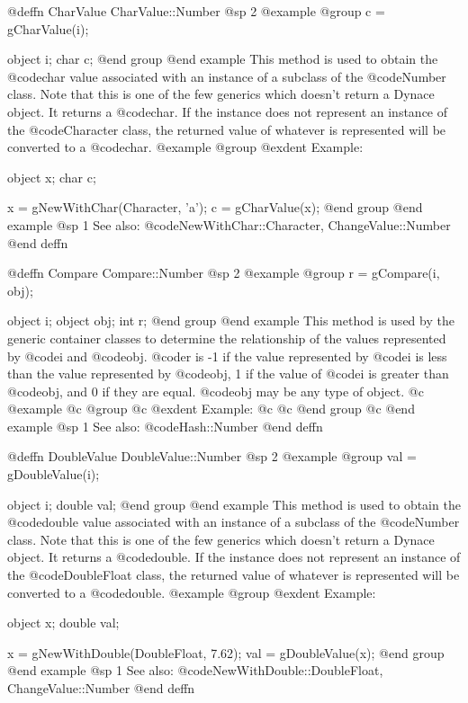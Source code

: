 @deffn {CharValue} CharValue::Number
@sp 2
@example
@group
c = gCharValue(i);

object  i;
char    c;
@end group
@end example
This method is used to obtain the @code{char} value associated with an
instance of a subclass of the @code{Number} class.  Note that this is
one of the few generics which doesn't return a Dynace object.  It
returns a @code{char}.  If the instance does not represent an instance
of the @code{Character} class, the returned value of whatever is
represented will be converted to a @code{char}.
@example
@group
@exdent Example:

object  x;
char    c;

x = gNewWithChar(Character, 'a');
c = gCharValue(x);
@end group
@end example
@sp 1
See also:  @code{NewWithChar::Character, ChangeValue::Number}
@end deffn








@deffn {Compare} Compare::Number
@sp 2
@example
@group
r = gCompare(i, obj);

object  i;
object  obj;
int     r;
@end group
@end example
This method is used by the generic container classes to determine
the relationship of the values represented by @code{i} and @code{obj}. 
@code{r} is -1 if the value represented by @code{i} is less than
the value represented by @code{obj}, 1 if the value of @code{i}
is greater than @code{obj}, and 0 if they are equal.  @code{obj}
may be any type of object.
@c @example
@c @group
@c @exdent Example:
@c
@c @end group
@c @end example
@sp 1
See also:  @code{Hash::Number}
@end deffn







@deffn {DoubleValue} DoubleValue::Number
@sp 2
@example
@group
val = gDoubleValue(i);

object  i;
double  val;
@end group
@end example
This method is used to obtain the @code{double} value associated
with an instance of a subclass of the @code{Number} class.  Note that
this is one of the few generics which doesn't return a Dynace object.
It returns a @code{double}.  If the instance does not represent
an instance of the @code{DoubleFloat} class, the returned value
of whatever is represented will be converted to a @code{double}.
@example
@group
@exdent Example:

object  x;
double  val;

x = gNewWithDouble(DoubleFloat, 7.62);
val = gDoubleValue(x);
@end group
@end example
@sp 1
See also:  @code{NewWithDouble::DoubleFloat, ChangeValue::Number}
@end deffn










